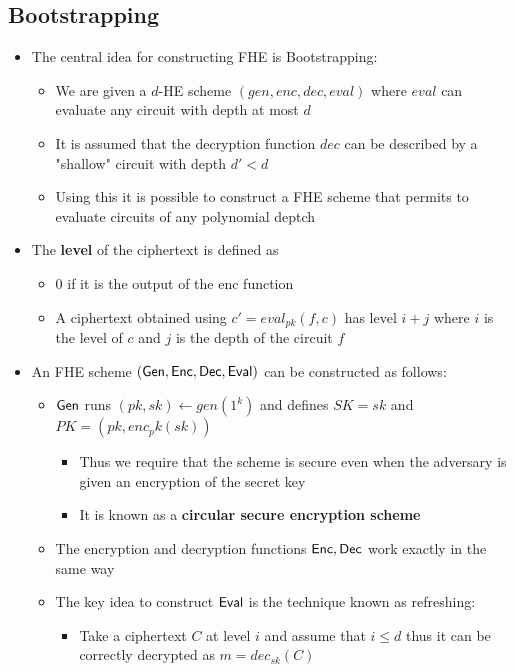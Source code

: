 \subsection{Bootstrapping}%
\begin{itemize}
    \item The central idea for constructing FHE is Bootstrapping:
    \begin{itemize}
        \item We are given a $d$-HE scheme $(gen, enc, dec, eval)$ where $eval$ can evaluate any circuit with depth at most $d$
        \item It is assumed that the decryption function $dec$ can be described by a "shallow" circuit with depth $d' < d$ 
        \item Using this it is possible to construct a FHE scheme that permits to evaluate circuits of any polynomial deptch
    \end{itemize}
    \item The \textbf{level} of the ciphertext is defined as 
    \begin{itemize}
        \item $0$ if it is the output of the enc function
        \item A ciphertext obtained using $c' = eval_{pk}(f,c)$ has level $i+j$ where $i$ is the level of $c$ and $j$ is the depth of the circuit $f$
    \end{itemize}
    \item An FHE scheme $(\mathsf{Gen}, \mathsf{Enc}, \mathsf{Dec}, \mathsf{Eval})$ can be constructed as follows:
    \begin{itemize}
        \item $\mathsf{Gen}$ runs $(pk, sk) \leftarrow gen(1^k)$ and defines $SK = sk$ and $PK = (pk, enc_pk(sk))$
        \begin{itemize}
            \item Thus we require that the scheme is secure even when the adversary is given an encryption of the secret key
            \item It is known as a \textbf{circular secure encryption scheme} 
        \end{itemize}
        \item The encryption and decryption functions $\mathsf{Enc}, \mathsf{Dec}$ work exactly in the same way
        \item The key idea to construct $\mathsf{Eval}$ is the technique known as refreshing:
        \begin{itemize}
            \item Take a ciphertext $C$ at level $i$ and assume that $i \leq d$ thus it can be correctly decrypted as $m = dec_{sk}(C)$

\end{itemize}
\end{itemize}
\end{itemize}
